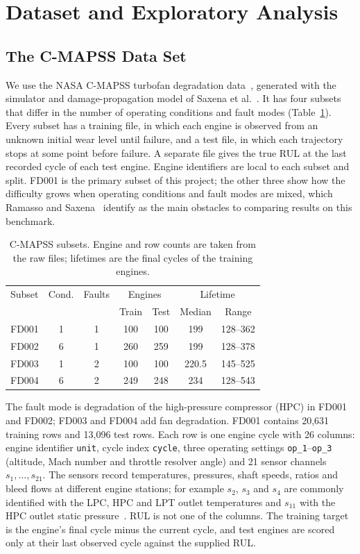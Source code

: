 \section{Dataset and Exploratory Analysis}
\label{sec:dataset_eda}

\subsection{The C-MAPSS Data Set}
We use the NASA C-MAPSS turbofan degradation data~\cite{Saxena2008turbofan},
generated with the simulator and damage-propagation model of Saxena
et al.~\cite{Saxena2008damage}. It has four subsets that differ in the number of
operating conditions and fault modes (Table~\ref{tab:subsets}). Every subset
has a training file, in which each engine is observed from an unknown initial
wear level until failure, and a test file, in which each trajectory stops at
some point before failure. A separate file gives the true RUL at the last
recorded cycle of each test engine. Engine identifiers are local to each
subset and split. FD001 is the primary subset of this project; the other three
show how the difficulty grows when operating conditions and fault modes are
mixed, which Ramasso and Saxena~\cite{Ramasso2014performance} identify as the
main obstacles to comparing results on this benchmark.

\begin{table}[!t]
\centering
\caption{C-MAPSS subsets. Engine and row counts are taken from the raw files;
lifetimes are the final cycles of the training engines.}
\label{tab:subsets}
\begin{tabular}{lcccccc}
\hline
Subset & Cond. & Faults & \multicolumn{2}{c}{Engines} & \multicolumn{2}{c}{Lifetime} \\
       &       &        & Train & Test & Median & Range \\
\hline
FD001 & 1 & 1 & 100 & 100 & 199   & 128--362 \\
FD002 & 6 & 1 & 260 & 259 & 199   & 128--378 \\
FD003 & 1 & 2 & 100 & 100 & 220.5 & 145--525 \\
FD004 & 6 & 2 & 249 & 248 & 234   & 128--543 \\
\hline
\end{tabular}
\end{table}

The fault mode is degradation of the high-pressure compressor (HPC) in FD001
and FD002; FD003 and FD004 add fan degradation. FD001 contains 20,631 training
rows and 13,096 test rows. Each row is one engine cycle with 26 columns: engine
identifier \texttt{unit}, cycle index \texttt{cycle}, three operating settings
\texttt{op\_1}--\texttt{op\_3} (altitude, Mach number and throttle resolver
angle) and 21 sensor channels $s_1,\dots,s_{21}$. The sensors record
temperatures, pressures, shaft speeds, ratios and bleed flows at different
engine stations; for example $s_2$, $s_3$ and $s_4$ are commonly identified
with the LPC, HPC and LPT outlet temperatures and $s_{11}$ with the HPC outlet
static pressure~\cite{Saxena2008damage}. RUL is not one of the columns. The
training target is the engine's final cycle minus the current cycle, and test
engines are scored only at their last observed cycle against the supplied RUL.

